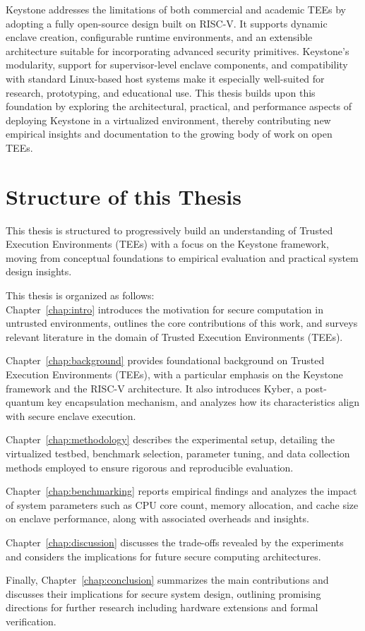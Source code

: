 Keystone addresses the limitations of both commercial and academic TEEs by adopting a fully open-source design built on RISC-V. It supports dynamic enclave creation, configurable runtime environments, and an extensible architecture suitable for incorporating advanced security primitives. Keystone’s modularity, support for supervisor-level enclave components, and compatibility with standard Linux-based host systems make it especially well-suited for research, prototyping, and educational use. This thesis builds upon this foundation by exploring the architectural, practical, and performance aspects of deploying Keystone in a virtualized environment, thereby contributing new empirical insights and documentation to the growing body of work on open TEEs.

\section{Structure of this Thesis}

This thesis is structured to progressively build an understanding of Trusted Execution Environments (TEEs) with a focus on the Keystone framework, moving from conceptual foundations to empirical evaluation and practical system design insights.

This thesis is organized as follows: 
\\
Chapter~\ref{chap:intro} introduces the motivation for secure computation in untrusted environments, outlines the core contributions of this work, and surveys relevant literature in the domain of Trusted Execution Environments (TEEs). 

Chapter~\ref{chap:background} provides foundational background on Trusted Execution Environments (TEEs), with a particular emphasis on the Keystone framework and the RISC-V architecture. It also introduces Kyber, a post-quantum key encapsulation mechanism, and analyzes how its characteristics align with secure enclave execution. 

Chapter~\ref{chap:methodology} describes the experimental setup, detailing the virtualized testbed, benchmark selection, parameter tuning, and data collection methods employed to ensure rigorous and reproducible evaluation. 

Chapter~\ref{chap:benchmarking} reports empirical findings and analyzes the impact of system parameters such as CPU core count, memory allocation, and cache size on enclave performance, along with associated overheads and insights. 


Chapter~\ref{chap:discussion} discusses the trade-offs revealed by the experiments and considers the implications for future secure computing architectures.

Finally, Chapter~\ref{chap:conclusion} summarizes the main contributions and discusses their implications for secure system design, outlining promising directions for further research including hardware extensions and formal verification.